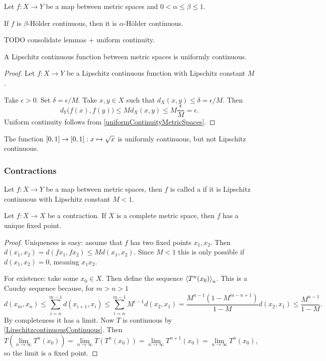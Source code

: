 \begin{lemma} \label{HolderLipschitzContinuity}
Let $f: X\to Y$ be a map between metric spaces and $0<\alpha \leq \beta \leq 1$.

If $f$ is $\beta$-Hölder continuous, then it is $\alpha$-Hölder continuous.
\end{lemma}
TODO consolidate lemmas + uniform continuity.
\begin{lemma} \label{LipschitzcontinuousContinuous}
A Lipschitz continuous function between metric spaces is uniformly continuous.
\end{lemma}
\begin{proof}
Let $f:X\to Y$ be a Lipschitz continuous function with Lipschitz constant $M$.

Take $\epsilon >0$. Set $\delta = \epsilon / M$. Take $x,y\in X$ such that $d_X(x,y)\leq \delta = \epsilon / M$. Then
\[ d_Y\big(f(x), f(y)\big) \leq Md_X(x,y) \leq M\frac{\epsilon}{M} = \epsilon. \]
Uniform continuity follows from \ref{uniformContinuityMetricSpaces}.
\end{proof}

\begin{example}
The function $\interval{0,1} \to \interval{0,1}: x\mapsto \sqrt{x}$ is uniformly continuous, but not Lipschitz continuous.
\end{example}

\subsubsection{Contractions}
\begin{definition}
Let $f: X\to Y$ be a map between metric spaces, then $f$ is called a  if it is Lipschitz continuous with Lipschitz constant $M < 1$.
\end{definition}

\begin{proposition} \label{contractionFixedPoint}
Let $f: X\to X$ be a contraction. If $X$ is a complete metric space, then $f$ has a unique fixed point.
\end{proposition}
\begin{proof}
Uniqueness is easy: assume that $f$ has two fixed points $x_1, x_2$. Then $d(x_1,x_2) = d(fx_1, fx_2) \leq M d(x_1,x_2)$. Since $M < 1$ this is only possible if $d(x_1,x_2) = 0$, meaning $x_1  x_2$.

For existence: take some $x_0\in X$. Then define the sequence $\left\langle T^n(x_0) \right\rangle_n$. This is a Cauchy sequence because, for $m>n>1$
\[ d(x_m,x_n) \leq \sum_{i=n}^{m-1}d(x_{i+1}, x_i) \leq \sum^{m-1}_{i=n}M^{i-1}d(x_2,x_1) = \frac{M^{n-1}(1-M^{m-n+1})}{1-M}d(x_2,x_1) \leq \frac{M^{n-1}}{1-M}. \]
By completeness it has a limit. Now $T$ is continuous by \ref{LipschitzcontinuousContinuous}. Then
\[ T\left(\lim_{n\to \infty} T^n(x_0)\right) = \lim_{n\to \infty}T(T^n(x_0)) = \lim_{n\to \infty}T^{n+1}(x_0) = \lim_{n\to \infty} T^n(x_0),  \]
so the limit is a fixed point.
\end{proof}

